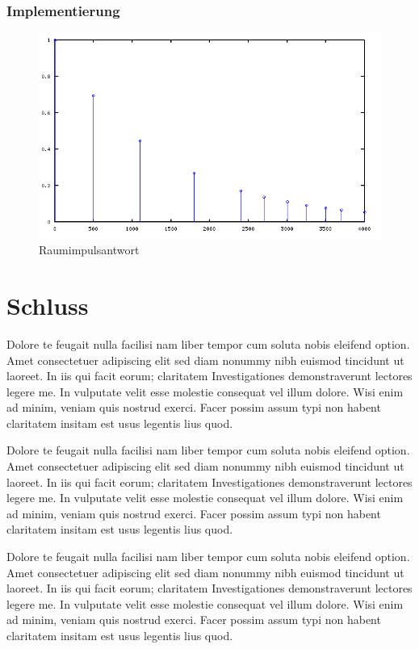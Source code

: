 \documentclass[a4paper,12pt,fontsize=12,DIV=12]{scrartcl}
\begin{document}
\subsubsection{Implementierung}
\begin{figure}[h]
	\includegraphics[scale=0.5]{Bilder/signalabgriffe.png}
	\caption{Raumimpulsantwort}
	\label{labelname}
\end{figure}

\section{Schluss}
Dolore te feugait nulla facilisi nam liber tempor cum soluta nobis eleifend option. Amet consectetuer adipiscing elit sed diam nonummy nibh euismod tincidunt ut laoreet. In iis qui facit eorum; claritatem Investigationes demonstraverunt lectores legere me. In vulputate velit esse molestie consequat vel illum dolore. Wisi enim ad minim, veniam quis nostrud exerci. Facer possim assum typi non habent claritatem insitam est usus legentis lius quod.

Dolore te feugait nulla facilisi nam liber tempor cum soluta nobis eleifend option. Amet consectetuer adipiscing elit sed diam nonummy nibh euismod tincidunt ut laoreet. In iis qui facit eorum; claritatem Investigationes demonstraverunt lectores legere me. In vulputate velit esse molestie consequat vel illum dolore. Wisi enim ad minim, veniam quis nostrud exerci. Facer possim assum typi non habent claritatem insitam est usus legentis lius quod.

Dolore te feugait nulla facilisi nam liber tempor cum soluta nobis eleifend option. Amet consectetuer adipiscing elit sed diam nonummy nibh euismod tincidunt ut laoreet. In iis qui facit eorum; claritatem Investigationes demonstraverunt lectores legere me. In vulputate velit esse molestie consequat vel illum dolore. Wisi enim ad minim, veniam quis nostrud exerci. Facer possim assum typi non habent claritatem insitam est usus legentis lius quod.
\end{document}
